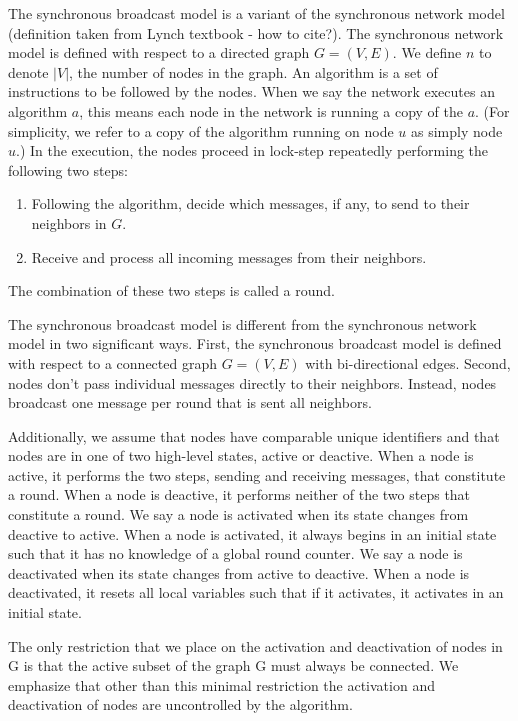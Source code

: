 \documentclass[english]{article}
\begin{document}
The synchronous broadcast model is a variant of the synchronous network model (definition taken from Lynch textbook - how to cite?). The synchronous network model is defined with respect to a directed graph $G=(V,E)$. We define $n$ to denote $|V|$, the number of nodes in the graph. An algorithm is a set of instructions to be followed by the nodes. When we say the network executes an algorithm $a$, this means each node in the network is running a copy of the $a$. (For simplicity, we refer to a copy of the algorithm running on node $u$ as simply node $u$.) In the execution, the nodes proceed in lock-step repeatedly performing the following two steps:
\begin{enumerate}
  \item Following the algorithm, decide which messages, if any, to send to their neighbors in $G$.
  \item Receive and process all incoming messages from their neighbors.
\end{enumerate}
The combination of these two steps is called a round.

The synchronous broadcast model is different from the synchronous network model in two significant ways. First, the synchronous broadcast model is defined with respect to a connected graph $G=(V,E)$ with bi-directional edges. Second, nodes don't pass individual messages directly to their neighbors. Instead, nodes broadcast one message per round that is sent all neighbors. 

Additionally, we assume that nodes have comparable unique identifiers and that nodes are in one of two high-level states, active or deactive. When a node is active, it performs the two steps, sending and receiving messages, that constitute a round. When a node is deactive, it performs neither of the two steps that constitute a round. We say a node is activated when its state changes from deactive to active. When a node is activated, it always begins in an initial state such that it has no knowledge of a global round counter. We say a node is deactivated when its state changes from active to deactive. When a node is deactivated, it resets all local variables such that if it activates, it activates in an initial state.

The only restriction that we place on the activation and deactivation of nodes in G is that the active subset of the graph G must always be connected. We emphasize that other than this minimal restriction the activation and deactivation of nodes are uncontrolled by the algorithm. 
\end{document}
